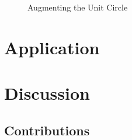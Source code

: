 \documentclass[11pt,reqno]{article}
\theoremstyle{definition}
\begin{document}
\begin{figure}%
  \centering
  \hfill
  \caption{Augmenting the Unit Circle}
  \label{fig:1}
\end{figure}

\section{Application}

\section{Discussion}

\subsection*{Contributions}
\end{document}
